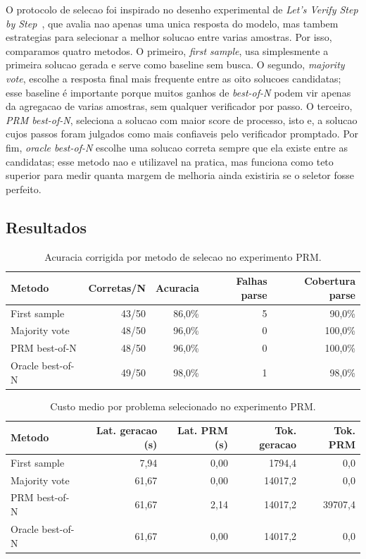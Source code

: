\documentclass[a4paper,12pt]{article}
\begin{document}
O protocolo de selecao foi inspirado no desenho experimental de
\emph{Let's Verify Step by Step}~\cite{lightman2023verify}, que avalia nao
apenas uma unica resposta do modelo, mas tambem estrategias para selecionar a
melhor solucao entre varias amostras. Por isso, comparamos quatro metodos. O
primeiro, \emph{first sample}, usa simplesmente a primeira solucao gerada e
serve como baseline sem busca. O segundo, \emph{majority vote}, escolhe a
resposta final mais frequente entre as oito solucoes candidatas; esse baseline
é importante porque muitos ganhos de \emph{best-of-N} podem vir apenas da
agregacao de varias amostras, sem qualquer verificador por passo. O terceiro,
\emph{PRM best-of-N}, seleciona a solucao com maior score de processo, isto e,
a solucao cujos passos foram julgados como mais confiaveis pelo verificador
promptado. Por fim, \emph{oracle best-of-N} escolhe uma solucao correta sempre
que ela existe entre as candidatas; esse metodo nao e utilizavel na pratica,
mas funciona como teto superior para medir quanta margem de melhoria ainda
existiria se o seletor fosse perfeito.


\subsection{Resultados}

\begin{table}[h]
\centering
\caption{Acuracia corrigida por metodo de selecao no experimento PRM.}
\label{tab:prm_accuracy}
\begin{tabular}{lrrrr}
\toprule
Metodo & Corretas/N & Acuracia & Falhas parse & Cobertura parse \\
\midrule
First sample & 43/50 & 86,0\% & 5 & 90,0\% \\
Majority vote & 48/50 & 96,0\% & 0 & 100,0\% \\
PRM best-of-N & 48/50 & 96,0\% & 0 & 100,0\% \\
Oracle best-of-N & 49/50 & 98,0\% & 1 & 98,0\% \\
\bottomrule
\end{tabular}
\end{table}

\begin{table}[h]
\centering
\caption{Custo medio por problema selecionado no experimento PRM.}
\label{tab:prm_cost}
\begin{tabular}{lrrrr}
\toprule
Metodo & Lat. geracao (s) & Lat. PRM (s) & Tok. geracao & Tok. PRM \\
\midrule
First sample & 7,94 & 0,00 & 1794,4 & 0,0 \\
Majority vote & 61,67 & 0,00 & 14017,2 & 0,0 \\
PRM best-of-N & 61,67 & 2,14 & 14017,2 & 39707,4 \\
Oracle best-of-N & 61,67 & 0,00 & 14017,2 & 0,0 \\
\bottomrule
\end{tabular}
\end{table}
\end{document}
